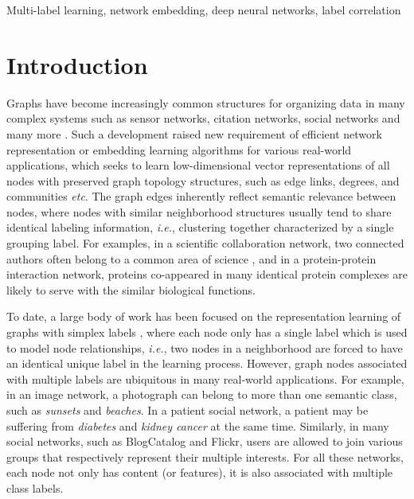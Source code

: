 \documentclass[conference]{IEEEtran}
\begin{document}
\begin{IEEEkeywords}
Multi-label learning, network embedding, deep neural networks, label correlation
\end{IEEEkeywords}

\section{Introduction}
Graphs have become increasingly common structures for organizing data in many complex systems such as sensor networks, citation networks, social networks and many more \cite{zhang2018network}. Such a development raised new requirement of efficient network representation or embedding learning algorithms for various real-world applications, which seeks to learn low-dimensional vector representations of all nodes with preserved graph topology structures, such as edge links, degrees, and communities \textit{etc}. The graph edges inherently reflect semantic relevance between nodes, where nodes with similar neighborhood structures usually tend to share identical labeling information, \textit{i.e.}, clustering together characterized by a single grouping label. For examples, in a scientific collaboration network, two connected authors often belong to a common area of science \cite{2,3}, and in a protein-protein interaction network, proteins co-appeared in many identical  protein complexes are likely to serve with the similar biological functions.

To date, a large body of work has been focused on the representation learning of graphs with simplex labels \cite{4,5}, where each node only has a single label which is used to model node relationships, \textit{i.e.}, two nodes in a neighborhood are forced to have an identical unique label in the learning process. However, graph nodes associated with multiple labels are ubiquitous in many real-world applications. For example, in an image network, a photograph can belong to more than one semantic class, such as \textit{sunsets} and \textit{beaches}. In a patient social network, a patient may be suffering from \textit{diabetes} and \textit{kidney cancer} at the same time. Similarly, in many social networks, such as BlogCatalog and Flickr, users are allowed to join various groups that respectively represent their multiple interests. For all these networks, each node not only has content (or features), it is also associated with multiple class labels. 
\end{document}

